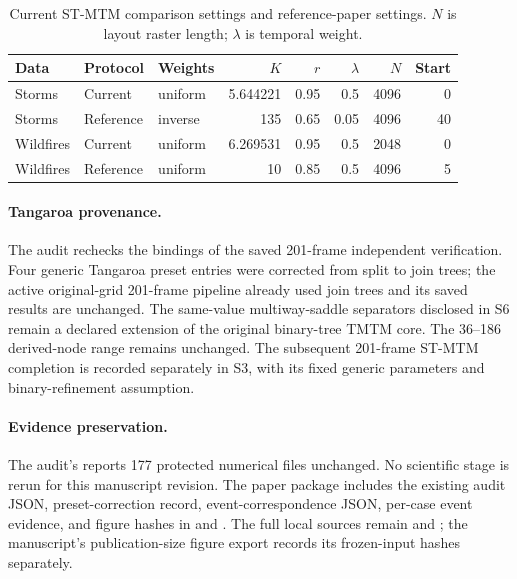 \begin{table}[H]\centering\small
\caption{Current ST-MTM comparison settings and reference-paper settings. $N$ is layout raster length; $\lambda$ is temporal weight.}\label{tab:s_baseline_parameters}
\setlength{\tabcolsep}{5pt}
\begin{tabular}{lllrrrrr}\toprule
Data & Protocol & Weights & $K$ & $r$ & $\lambda$ & $N$ & Start\\\midrule
Storms & Current & uniform & 5.644221 & 0.95 & 0.5 & 4096 & 0\\
Storms & Reference & inverse & 135 & 0.65 & 0.05 & 4096 & 40\\
Wildfires & Current & uniform & 6.269531 & 0.95 & 0.5 & 2048 & 0\\
Wildfires & Reference & uniform & 10 & 0.85 & 0.5 & 4096 & 5\\
\bottomrule\end{tabular}\end{table}

\paragraph{Tangaroa provenance.} The audit rechecks the bindings of the saved 201-frame independent verification. Four generic Tangaroa preset entries were corrected from split to join trees; the active original-grid 201-frame pipeline already used join trees and its saved results are unchanged. The same-value multiway-saddle separators disclosed in S6 remain a declared extension of the original binary-tree TMTM core. The 36--186 derived-node range remains unchanged. The subsequent 201-frame ST-MTM completion is recorded separately in S3, with its fixed generic parameters and binary-refinement assumption.

\paragraph{Evidence preservation.} The audit's  reports 177 protected numerical files unchanged. No scientific stage is rerun for this manuscript revision. The paper package includes the existing audit JSON, preset-correction record, event-correspondence JSON, per-case event evidence, and figure hashes in  and . The full local sources remain  and ; the manuscript's publication-size figure export records its frozen-input hashes separately.
